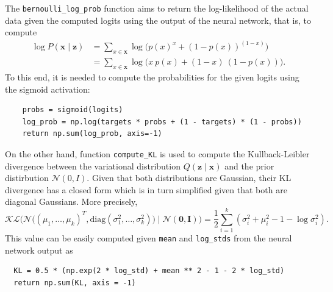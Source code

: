 \documentclass[11pt]{article}
\begin{document}
 The \texttt{bernoulli\_log\_prob} function aims to return the log-likelihood of the actual data given the computed logits using the output of the neural network, that is, to compute
 \[
   \begin{aligned}
     \log P(\bm{x} \mid \bm{z}) &= \sum_{x \in \bm{x}}\log\Big(p(x)^{x} + (1-p(x))^{(1-x)}\Big)\\
      &= \sum_{x \in \bm{x}}\log\Big( x\ p(x) + (1-x)\ (1-p(x))\Big).
     \end{aligned}
  \]
  To this end, it is needed to compute the probabilities for the given logits using the sigmoid activation:
  \begin{verbatim}
    probs = sigmoid(logits)
    log_prob = np.log(targets * probs + (1 - targets) * (1 - probs))
    return np.sum(log_prob, axis=-1)
  \end{verbatim}
  On the other hand, function \texttt{compute\_KL} is used to compute the Kullback-Leibler divergence between the variational distribution \( Q(\bm{z} \mid \bm{x}) \)  and the prior distirbution \( \mathcal{N}(0, I)\). Given that both distributions are Gaussian, their KL divergence has a closed form which is in turn simplified given that both are diagonal Gaussians. More precisely,
  \[
    \mathcal{KL}\Big( \mathcal{N}\big((\mu_{1}, \dots, \mu_{k})^{T}, \text{diag}(\sigma^{2}_{1}, \dots, \sigma^{2}_{k}) \big) \mid \mathcal{N}(\bm{0}, \bm{I}) \Big) = \frac{1}{2}\sum_{i=1}^{k}\left( \sigma_{i}^{2} + \mu_{i}^{2} - 1 - \log\sigma_{i}^{2} \right).
  \]
  This value can be easily computed given \texttt{mean} and \texttt{log\_stds} from the neural network output as

\begin{verbatim}
  KL = 0.5 * (np.exp(2 * log_std) + mean ** 2 - 1 - 2 * log_std)
  return np.sum(KL, axis = -1)
\end{verbatim}
\end{document}
